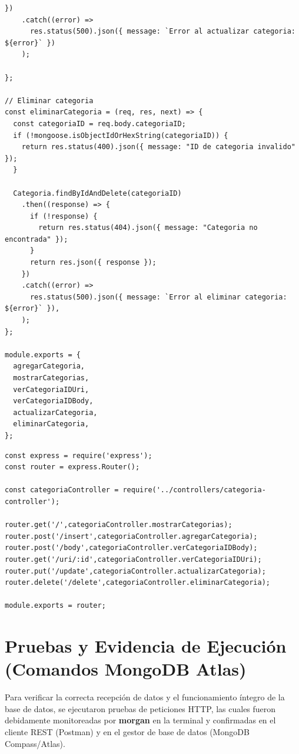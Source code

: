 \begin{lstlisting}[caption={Controlador de Categoría (controllers/categoria-controller.js)}]
    })
    .catch((error) =>
      res.status(500).json({ message: `Error al actualizar categoria: ${error}` })
    );
  
};

// Eliminar categoria
const eliminarCategoria = (req, res, next) => {
  const categoriaID = req.body.categoriaID;
  if (!mongoose.isObjectIdOrHexString(categoriaID)) {
    return res.status(400).json({ message: "ID de categoria invalido" });
  }

  Categoria.findByIdAndDelete(categoriaID)
    .then((response) => {
      if (!response) {
        return res.status(404).json({ message: "Categoria no encontrada" });
      }
      return res.json({ response });
    })
    .catch((error) =>
      res.status(500).json({ message: `Error al eliminar categoria: ${error}` }),
    );
};

module.exports = {
  agregarCategoria,
  mostrarCategorias,
  verCategoriaIDUri,
  verCategoriaIDBody,
  actualizarCategoria,
  eliminarCategoria,
};
\end{lstlisting}

\begin{lstlisting}[caption={Rutas de Categoría (routes/categoria-router.js)}]
const express = require('express');
const router = express.Router();

const categoriaController = require('../controllers/categoria-controller');

router.get('/',categoriaController.mostrarCategorias);
router.post('/insert',categoriaController.agregarCategoria);
router.post('/body',categoriaController.verCategoriaIDBody);
router.get('/uri/:id',categoriaController.verCategoriaIDUri);
router.put('/update',categoriaController.actualizarCategoria);
router.delete('/delete',categoriaController.eliminarCategoria);

module.exports = router;
\end{lstlisting}

\section{Pruebas y Evidencia de Ejecución (Comandos MongoDB Atlas)}
Para verificar la correcta recepción de datos y el funcionamiento íntegro de la base de datos, se ejecutaron pruebas de peticiones HTTP, las cuales fueron debidamente monitoreadas por \textbf{morgan} en la terminal y confirmadas en el cliente REST (Postman) y en el gestor de base de datos (MongoDB Compass/Atlas).

